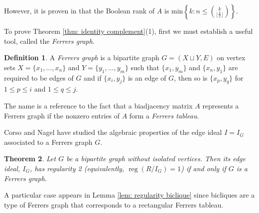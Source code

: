 \documentclass[11pt,letterpaper, reqno]{amsart}
\newtheorem{theorem}{Theorem}[section]
\theoremstyle{definition}
\newtheorem{definition}[theorem]{Definition}
\theoremstyle{remark}
\newtheorem{remark}[theorem]{Remark}
\DeclareMathOperator{\reg}{reg}
\numberwithin{equation}{section}
\begin{document}
However, it is proven in \cite[Corollary 2]{deCaen} that the Boolean rank of $A$ is min$\left \{ k : n \leq \displaystyle\binom{k}{\lfloor \frac{k}{2}\rfloor} \right \}$.

To prove Theorem \ref{thm: identity complement}(1), first we must establish a useful tool, called  the \textit{Ferrers graph}.
\begin{definition}
A \textit{Ferrers graph} is a bipartite graph $G=(X\sqcup Y,E)$ on vertex sets $X = \{x_1,\ldots,x_n\}$ and $Y = \{y_1,\ldots,y_m\}$ such that  $\{x_1,y_m\}$ and $\{x_n,y_1\}$ are required to be edges of $G$ and if $\{x_i,y_j\}$ is an edge of $G$, then so is $\{x_p,y_q\}$ for $1\leq p\leq i$ and $1\leq q\leq j$.
\end{definition}

  The name is a reference to the fact that a biadjacency matrix $A$ represents a Ferrers graph if the nonzero entries of $A$ form a \textit{Ferrers tableau}.

Corso and Nagel \cite{NagelCorso} have studied the algebraic properties of the edge ideal $I = I_G$ associated to a Ferrers graph $G$.
 
\begin{theorem}\cite[Thm.\,4.2]{NagelCorso}\label{thm:FerrersIdealReg}
Let $G$ be a bipartite graph without isolated vertices. Then its edge ideal, $I_G$, has regularity 2 (equivalently, $\reg(R/I_G)=1$)  if and only if $G$ is a Ferrers graph.
\end{theorem}

A particular case appears in Lemma \ref{lem: regularity biclique} since bicliques are a type of Ferrers graph that corresponds to a rectangular Ferrers tableau.
\end{document}
